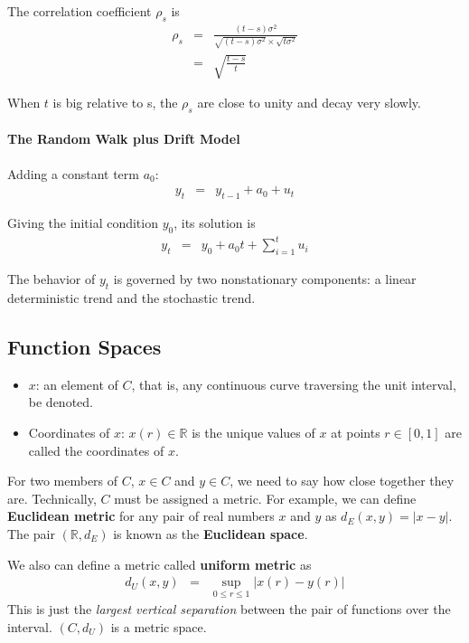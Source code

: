 \documentclass{article}
\begin{document}
The correlation coefficient $\rho_{s}$ is
\begin{eqnarray*}
\rho_{s}&=&\frac{(t-s)\sigma^{2}}{\sqrt{(t-s)\sigma^{2}}\times \sqrt{t\sigma^{2}}}\\
&=&\sqrt{\frac{t-s}{t}}
\end{eqnarray*}

When $t$ is big relative to s, the $\rho_{s}$  are close to unity and decay very slowly. 

\paragraph{The Random Walk plus Drift Model}
Adding a constant term $a_{0}$:
\begin{eqnarray*}
y_{t}&=&y_{t-1}+a_{0}+u_{t}
\end{eqnarray*}

Giving the initial condition $y_{0}$, its solution is
\begin{eqnarray*}
y_{t}&=&y_{0}+a_{0}t+\sum_{i=1}^{t}u_{i}
\end{eqnarray*}

The behavior of $y_{t}$ is governed by two nonstationary components: a linear deterministic trend and the stochastic trend. 

\subsection{Function Spaces}
\begin{itemize}
\item $x$: an element of $C$, that is, any continuous curve traversing the unit interval, be denoted.
\item Coordinates of $x$: $x(r)\in\mathbb{R}$ is the unique values of $x$ at points $r\in[0,1]$ are called the coordinates of $x$.
\end{itemize}

For two members of $C$, $x\in C$ and $y\in C$, we need to say how close together they are. Technically, $C$ must be assigned a metric. For example, we can define \textbf{Euclidean metric} for any pair of real numbers $x$ and $y$ as $d_{E}(x,y)=|x-y|$. The pair $(\mathbb{R},d_{E})$ is known as the \textbf{Euclidean space}. 
 
We also can define a metric called \textbf{uniform metric} as 
\begin{eqnarray*}
d_{U}(x,y)&=&\sup_{0\leq r\leq 1}|x(r)-y(r)|
\end{eqnarray*}
This is just the \textit{largest vertical separation} between the pair of functions over the interval. $(C,d_{U})$ is a metric space. 
\end{document}
